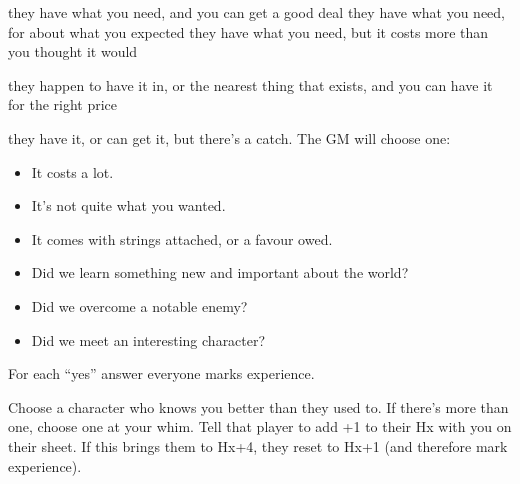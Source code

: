 {they have what you need, and you can get a good deal}
{they have what you need, for about what you expected}
{they have what you need, but it costs more than you thought it would}

{they happen to have it in, or the nearest thing that exists, and you can have it for the right price}
{they have it, or can get it, but there's a catch. The GM will choose one:
\begin{itemize}
\item It costs a lot.
\item It's not quite what you wanted.
\item It comes with strings attached, or a favour owed.
\end{itemize}}

\begin{itemize}
\item Did we learn something new and important about the world?
\item Did we overcome a notable enemy?
\item Did we meet an interesting character?
\end{itemize}

For each ``yes'' answer everyone marks experience.

Choose a character who knows you better than they used to. If there's
more than one, choose one at your whim. Tell that player to add +1 to
their Hx with you on their sheet. If this brings them to Hx+4, they
reset to Hx+1 (and therefore mark experience).
